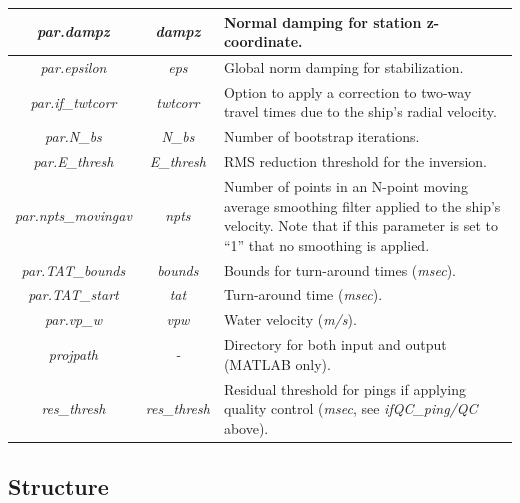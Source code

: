 \documentclass[titlepage, 12pt]{article}
\begin{document}
\begin{table}[h!]
\begin{tabularx}{\linewidth}{|c|c|X|}
    \textit{par.dampz}          & \textit{dampz}             & Normal damping for station z-coordinate.\\ \hline
    \textit{par.epsilon}        & \textit{eps}               & Global norm damping for stabilization.\\ \hline
    \textit{par.if\_twtcorr}    & \textit{twtcorr}           & Option to apply a correction to two-way travel times due to the ship's radial velocity.\\ \hline
    \textit{par.N\_bs}          & \textit{N\_bs}             & Number of bootstrap iterations.\\ \hline
    \textit{par.E\_thresh}      & \textit{E\_thresh}         & RMS reduction threshold for the inversion.\\ \hline
    \textit{par.npts\_movingav} & \textit{npts}              & Number of points in an N-point moving average smoothing filter applied to the ship's velocity. Note that if this parameter is set to “1” that no smoothing is applied. \\ \hline
    \textit{par.TAT\_bounds}    & \textit{bounds}            & Bounds for turn-around times (\textit{msec}).\\ \hline
    \textit{par.TAT\_start}     & \textit{tat}               & Turn-around time (\textit{msec}).\\ \hline
    \textit{par.vp\_w}          & \textit{vpw}               & Water velocity (\textit{m/s}). \\ \hline
    \textit{projpath}           & \textit{-}                 & Directory for both input and output (MATLAB only). \\ \hline
    \textit{res\_thresh}        & \textit{res\_thresh}       & Residual threshold for pings if applying quality control (\textit{msec}, see \textit{ifQC\_ping/QC} above).\\ \hline
   \end{tabularx}
  \end{table}

  \subsection{Structure}
   
\end{document}
